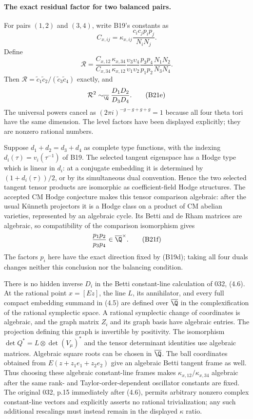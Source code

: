 \paragraph{The exact residual factor for two balanced pairs.}
For pairs $(1,2)$ and $(3,4)$, write B19's constants as
\[
 C_{x,ij}=\kappa_{x,ij}
                    \frac{c_ic_jp_ip_j}{N_iN_j}.
\]
Define
\[
 \mathcal R=
 \frac{C_{x,12}}{C_{x,34}}
 \frac{\kappa_{x,34}}{\kappa_{x,12}}
 \frac{\upsilon_3\upsilon_4}{\upsilon_1\upsilon_2}
 \frac{p_3p_4}{p_1p_2}\frac{N_1N_2}{N_3N_4}.
\]
Then $\mathcal R=\widetilde c_1\widetilde c_2/
(\widetilde c_3\widetilde c_4)$ exactly, and
\[
              \mathcal R^2\sim_{\overline\Q}
                        \frac{D_1D_2}{D_3D_4}.
 \tag{B21e}
\]
The universal powers cancel as
$(2\pi i)^{-g-g+g+g}=1$ because all four theta tori have
the same dimension.  The level factors have been displayed
explicitly; they are nonzero rational numbers.

Suppose $d_1+d_2=d_3+d_4$ as complete type functions,
with the indexing $d_i(\tau)=v_i(\tau^{-1})$ of B19.
The selected tangent eigenspace has a Hodge type which is
linear in $d_i$: at a conjugate embedding it is determined
by $(1+d_i(\tau))/2$, or by its simultaneous dual convention.
Hence the two selected tangent tensor products are isomorphic
as coefficient-field Hodge structures.  The accepted CM Hodge
conjecture makes this tensor comparison algebraic: after the
usual K\"unneth projectors it is a Hodge class on a product of
CM abelian varieties, represented by an algebraic cycle.
Its Betti and de Rham matrices are algebraic, so compatibility
of the comparison isomorphism gives
\[
                         \frac{p_1p_2}{p_3p_4}
                                      \in\overline\Q^\times.
 \tag{B21f}
\]
The factors $p_i$ here have the exact direction fixed by
(B19d); taking all four duals changes neither this conclusion
nor the balancing condition.

There is no hidden inverse $D_i$ in the Betti constant-line
calculation of 032, (4.6).  At the rational point $x=[Ez]$,
the line $L$, its annihilator, and every full compact embedding
summand in (4.5) are defined over $\overline\Q$ in the
complexification of the rational symplectic space.  A rational
symplectic change of coordinates is algebraic, and the graph
matrix $Z_i$ and its graph basis have algebraic entries.
The projection defining this graph is invertible by positivity.
The isomorphism
$\det Q^*=L\otimes\det(V_\mu)^*$ and the tensor determinant
identities use algebraic matrices.  Algebraic square roots can
be chosen in $\overline\Q$.  The ball coordinates obtained
from $E(z+z_1e_1+z_2e_2)$ give an algebraic Betti tangent frame
as well.  Thus choosing these algebraic constant-line frames
makes $\kappa_{x,12}/\kappa_{x,34}$ algebraic after the same
rank- and Taylor-order-dependent oscillator constants are fixed.
The original 032, p.15 immediately after (4.6), permits arbitrary
nonzero complex constant-line vectors and explicitly asserts no
rational trivialization; any such additional rescalings must
instead remain in the displayed $\kappa$ ratio.

